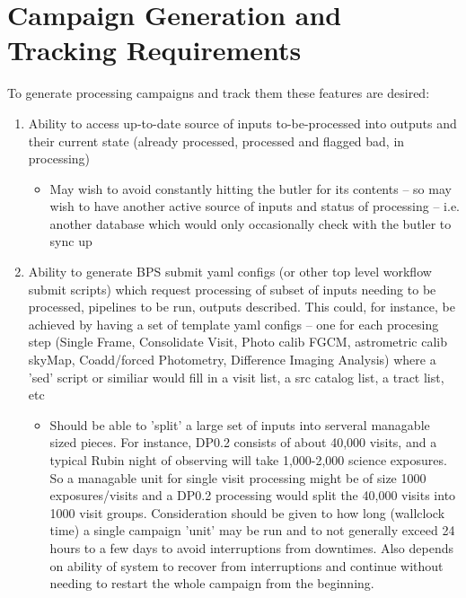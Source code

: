 \documentclass[DM,authoryear,toc]{lsstdoc}
\begin{document}
\section{Campaign Generation and Tracking Requirements}

 To generate processing campaigns and track them these features are desired:

	\begin{enumerate}

	\item Ability to access up-to-date source of inputs to-be-processed
		into outputs and their current state 
		(already processed, processed and flagged bad, 
		in processing)

	\begin{itemize}
	
	\item May wish to avoid constantly hitting the butler for
	its contents -- so may wish to have another active source
	of inputs and status of processing -- i.e. another database
	which would only occasionally check with the butler to sync up


	\end{itemize}

	\item Ability to generate BPS submit yaml configs 
	(or other top level workflow submit scripts) which request processing
	of subset of inputs needing to be processed, pipelines to be run,
	outputs described.  This could, for instance, be achieved by having
	a set of template yaml configs -- one for each procesing step
	(Single Frame, Consolidate Visit, Photo calib FGCM, 
	astrometric calib skyMap, Coadd/forced Photometry, Difference
	Imaging Analysis) where a 'sed' script or similiar would fill in
	a visit list, a src catalog list, a tract list, etc

	\begin{itemize}

	\item Should be able to 'split' a large set of inputs into
	serveral managable sized pieces.  For instance, DP0.2 consists of
	about 40,000 visits, and a typical Rubin night of observing will
	take 1,000-2,000 science exposures.   So a managable unit for
	single visit processing might be of size 1000 exposures/visits and
	a DP0.2 processing would split the 40,000 visits into 1000 visit
	groups.  Consideration should be given to how long (wallclock time)
	a single campaign 'unit' may be run and to not generally exceed 
	24 hours to a few days to avoid interruptions from downtimes.
	Also depends on ability of system to recover from interruptions and
	continue without needing to restart the whole campaign from
	the beginning.
	


\end{itemize}
\end{enumerate}
\end{document}
